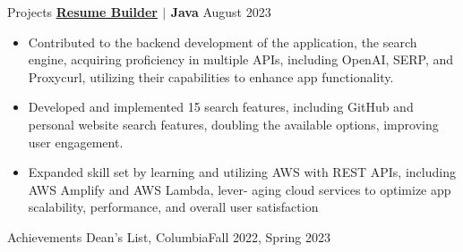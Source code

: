 \documentclass{resume} %
\begin{document}
\vspace{-0.4em}

\begin{rSection}{Projects}
{\textbf{\href{www.github.com/eden-chung}{\underline{Resume Builder}} $\vert$ Java}} \hfill August 2023 \\ 
\vspace{-1.5em}
\begin{itemize}
\item Contributed to the backend development of the application, the search engine, acquiring proficiency in multiple APIs, including OpenAI, SERP, and Proxycurl, utilizing their capabilities to enhance app functionality.
\vspace{-0.4em}
\item Developed and implemented 15 search features, including GitHub and personal website search features, doubling the available options, improving user engagement.
\vspace{-0.4em}
\item Expanded skill set by learning and utilizing AWS with REST APIs, including AWS Amplify and AWS Lambda, lever- aging cloud services to optimize app scalability, performance, and overall user satisfaction
\vspace{-0.4em}
\end{itemize}
\end{rSection}

\vspace{-0.2em}

\begin{rSection}{Achievements}
{Dean's List, Columbia}\hfill Fall 2022, Spring 2023\\ 
\end{rSection}

\end{document}
